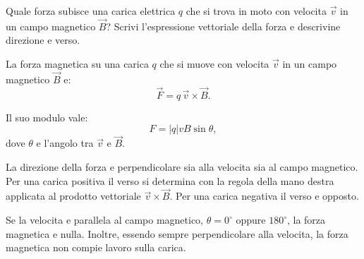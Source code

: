 
\begin{esercizio}
Quale forza subisce una carica elettrica \(q\) che si trova in moto con
velocita \(\vec v\) in un campo magnetico \(\vec B\)? Scrivi l'espressione
vettoriale della forza e descrivine direzione e verso.
\end{esercizio}

\begin{soluzione}
La forza magnetica su una carica \(q\) che si muove con velocita \(\vec v\) in
un campo magnetico \(\vec B\) e:
\[
\vec F=q\,\vec v\times \vec B.
\]

Il suo modulo vale:
\[
F=|q|vB\sin\theta,
\]
dove \(\theta\) e l'angolo tra \(\vec v\) e \(\vec B\).

La direzione della forza e perpendicolare sia alla velocita sia al campo
magnetico. Per una carica positiva il verso si determina con la regola della
mano destra applicata al prodotto vettoriale \(\vec v\times \vec B\). Per una
carica negativa il verso e opposto.

Se la velocita e parallela al campo magnetico, \(\theta=0^\circ\) oppure
\(180^\circ\), la forza magnetica e nulla. Inoltre, essendo sempre
perpendicolare alla velocita, la forza magnetica non compie lavoro sulla
carica.
\end{soluzione}
